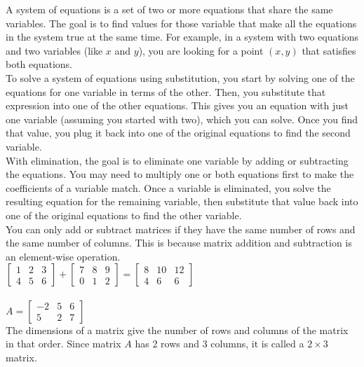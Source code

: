 \documentclass{article}
\begin{document}
A system of equations is a set of two or more equations that share the same variables. The goal is to find values for those variable that make all the equations in the system true at the same time. For example, in a system with two equations and two variables (like $x$ and $y$), you are looking for a point $(x, y)$ that satisfies both equations.\\

To solve a system of equations using substitution, you start by solving one of the equations for one variable in terms of the other. Then, you substitute that expression into one of the other equations. This gives you an equation with just one variable (assuming you started with two), which you can solve. Once you find that value, you plug it back into one of the original equations to find the second variable.\\

With elimination, the goal is to eliminate one variable by adding or subtracting the equations. You may need to multiply one or both equations first to make the coefficients of a variable match. Once a variable is eliminated, you solve the resulting equation for the remaining variable, then substitute that value back into one of the original equations to find the other variable.\\

You can only add or subtract matrices if they have the same number of rows and the same number of columns. This is because matrix addition and subtraction is an element-wise operation.\\

$
\begin{bmatrix}
	1 & 2 & 3\\
	4 & 5 & 6
\end{bmatrix}
+
\begin{bmatrix}
	7 & 8 & 9\\
	0 & 1 & 2
\end{bmatrix}
=
\begin{bmatrix}
	8 & 10 & 12\\
	4 & 6 & 6
\end{bmatrix}
$\\\\

$A = 
\begin{bmatrix}
	-2 & 5 & 6\\
	5 & 2 & 7
\end{bmatrix}
$\\

The dimensions of a matrix give the number of rows and columns of the matrix in that order. Since matrix $A$ has 2 rows and 3 columns, it is called a $2 \times 3$ matrix.\\
\end{document}
